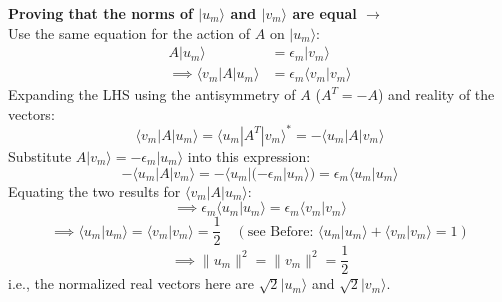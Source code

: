 \documentclass[11pt,a4paper]{article}
\begin{document}
\vspace{0.5cm}
\noindent\textbf{Proving that the norms of $|u_m\rangle$ and $|v_m\rangle$ are equal $\rightarrow$} \\
Use the same equation for the action of $A$ on $|u_m\rangle$:
\begin{align*}
A|u_m\rangle &= \epsilon_m|v_m\rangle \\
\implies \langle v_m|A|u_m\rangle &= \epsilon_m\langle v_m|v_m\rangle
\end{align*}
Expanding the LHS using the antisymmetry of $A$ ($A^T = -A$) and reality of the vectors:
\begin{equation*}
\langle v_m|A|u_m\rangle = \langle u_m|A^T|v_m\rangle^* = -\langle u_m|A|v_m\rangle
\end{equation*}
Substitute $A|v_m\rangle = -\epsilon_m|u_m\rangle$ into this expression:
\begin{equation*}
-\langle u_m|A|v_m\rangle = -\langle u_m|(-\epsilon_m|u_m\rangle) = \epsilon_m\langle u_m|u_m\rangle
\end{equation*}
Equating the two results for $\langle v_m|A|u_m\rangle$:
\begin{equation*}
\implies \epsilon_m\langle u_m|u_m\rangle = \epsilon_m\langle v_m|v_m\rangle
\end{equation*}
\begin{equation*}
\implies \langle u_m|u_m\rangle = \langle v_m|v_m\rangle = \frac{1}{2} \quad (\text{see Before: } \langle u_m|u_m\rangle + \langle v_m|v_m\rangle = 1)
\end{equation*}
\begin{equation*}
\implies \|u_m\|^2 = \|v_m\|^2 = \frac{1}{2}
\end{equation*}
i.e., the normalized real vectors here are $\sqrt{2}|u_m\rangle$ and $\sqrt{2}|v_m\rangle$.
\end{document}
